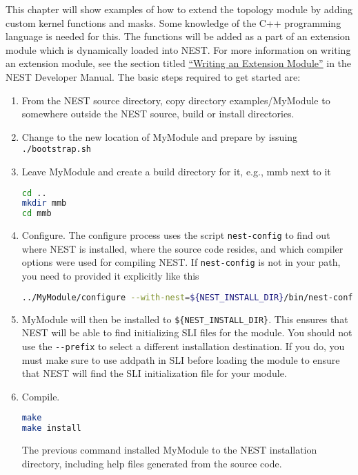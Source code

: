 \documentclass[a4paper,12pt]{report}
\begin{document}
This chapter will show examples of how to extend the topology module by
adding custom kernel functions and masks. Some knowledge of the C++
programming language is needed for this. The functions will be added as a
part of an extension module which is dynamically loaded into NEST. For more
information on writing an extension module, see the section titled
\href{http://www.nest-initiative.org/index.php/Writing_an_Extension_Module}{``Writing an Extension Module''}
in the NEST Developer Manual. The basic steps required to get started are:
\begin{enumerate}
\item From the NEST source directory, copy directory examples/MyModule to
  somewhere outside the NEST source, build or install directories.
\item Change to the new location of MyModule and prepare by issuing
  \lstinline!./bootstrap.sh!
\item Leave MyModule and create a build directory for it, e.g., mmb next to
  it
\begin{lstlisting}[language=bash]
cd ..
mkdir mmb
cd mmb
\end{lstlisting}
\item Configure. The configure process uses the script \lstinline!nest-config!
  to find out where NEST is installed, where the source code resides, and
  which compiler options were used for compiling NEST. If
  \lstinline!nest-config! is not in your path, you need to provided it
  explicitly like this
\begin{lstlisting}[language=bash]
../MyModule/configure --with-nest=${NEST_INSTALL_DIR}/bin/nest-config
\end{lstlisting}
\item MyModule will then be installed to \lstinline!${NEST_INSTALL_DIR}!. This
  ensures that NEST will be able to find initializing SLI files for the
  module.  You should not use the \lstinline!--prefix! to select a different
  installation destination. If you do, you must make sure to use addpath in
  SLI before loading the module to ensure that NEST will find the SLI
  initialization file for your module.
\item Compile.
\begin{lstlisting}[language=bash]
make
make install
\end{lstlisting}
The previous command installed MyModule to the NEST installation directory, including help files generated from the source code. 
\end{enumerate}
\end{document}

